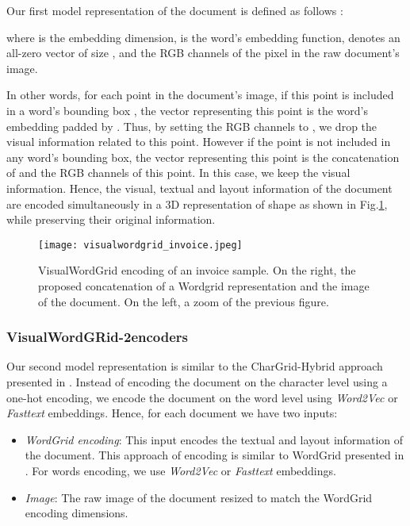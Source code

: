 \documentclass[conference]{IEEEtran}
\begin{document}
 Our first model representation of the document is defined as follows :


where  is the embedding dimension,  is the  word's embedding function,  denotes an all-zero vector of size , and  the RGB channels of the  pixel in the raw document's image. 

In other words, for each point in the document's image, if this point is included in a word's bounding box , the vector representing this point is the word's embedding padded by . Thus, by setting the RGB channels to , we drop the visual information related to this point. However if the point is not included in any word's bounding box, the vector representing this point is the concatenation of  and the RGB channels of this point. In this case, we keep the visual information.
Hence, the visual, textual and layout information of the document are encoded simultaneously in a 3D representation of shape  as shown in Fig.\ref{fig:visualwordgrid}, while preserving their original information.

\begin{figure}[!h]
\centering
\texttt{[image: visualwordgrid\_invoice.jpeg]}
\caption{VisualWordGrid encoding of an invoice sample. On the right, the proposed concatenation of a Wordgrid representation  and the image of the document. On the left, a zoom of the previous figure.}
\label{fig:visualwordgrid}  
\end{figure}

\subsubsection{VisualWordGRid-2encoders}\hfill

Our second model representation is similar to the CharGrid-Hybrid approach presented in \cite{chargrid}. Instead of encoding the document on the character level using a one-hot encoding, we encode the document on the word level using \textit{Word2Vec} \cite{word2vec}  or  \textit{Fasttext} \cite{fasttext} embeddings. Hence, for each document we have two inputs:
\begin{itemize}
\item \textit{WordGrid encoding}: This input encodes the textual and  layout information of the document.  This approach of encoding is similar to WordGrid presented in \cite{chargrid}.
For words encoding, we use \textit{Word2Vec} or  \textit{Fasttext} embeddings.


\item \textit{Image}: The raw image of the document resized to match the WordGrid encoding dimensions. 
\end{itemize}
\end{document}
